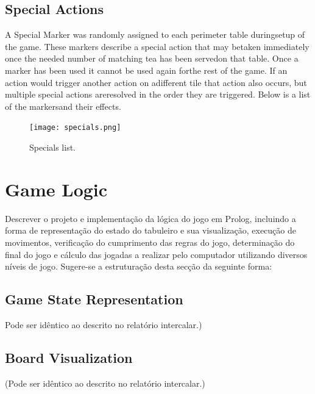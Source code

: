 \documentclass[a4paper]{article}
\begin{document}
\subsection{Special​ ​Actions}
A​ ​Special​ ​Marker​ ​was​ ​randomly​ ​assigned​ ​to​ ​each​ ​perimeter​ ​table​ ​during​ ​setup​ ​of​ ​the
game.​ ​These​ ​markers​ ​describe​ ​a​ ​special​ ​action​ ​that​ ​may​ ​be​ ​taken​ ​immediately​ ​once​ ​the​ ​needed
number​ ​of​ ​matching​ ​tea​ ​has​ ​been​ ​served​ ​on​ ​that​ ​table.​ ​Once​ ​a​ ​marker​ ​has​ ​been​ ​used​ ​it​ ​cannot​ ​be
used​ ​again​ ​for​ ​the​ ​rest​ ​of​ ​the​ ​game.​ ​If​ ​an​ ​action​ ​would​ ​trigger​ ​another​ ​action​ ​on​ ​a​ ​different​ ​tile
that​ ​action​ ​also​ ​occurs,​ ​but​ ​multiple​ ​special​ ​actions​ ​are​ ​resolved​ ​in​ ​the​ ​order​ ​they​ ​are​ ​triggered.
Below​ ​is​ ​a​ ​list​ ​of​ ​the​ ​markers​ ​and​ ​their​ ​effects.


\begin{figure}[!h]
\centering
{}
  \texttt{[image: specials.png]}
  \caption{Specials list.}\label{fig:specials}
\endminipage\hfill

\end{figure}










\section{Game Logic}

Descrever o projeto e implementação da lógica do jogo em Prolog, incluindo a forma de representação do estado do tabuleiro e sua visualização, execução de movimentos, verificação do cumprimento das regras do jogo, determinação do final do jogo e cálculo das jogadas a realizar pelo computador utilizando diversos níveis de jogo. Sugere-se a estruturação desta secção da seguinte forma:

\subsection{Game State Representation} Pode ser idêntico ao descrito no relatório intercalar.)

\subsection{Board Visualization} (Pode ser idêntico ao descrito no relatório intercalar.)
\end{document}
